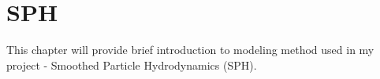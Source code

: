 

\chapter{SPH}


\graphicspath{{sph/figures/}}

This chapter will provide brief introduction to modeling method used in my project - Smoothed Particle Hydrodynamics (SPH).